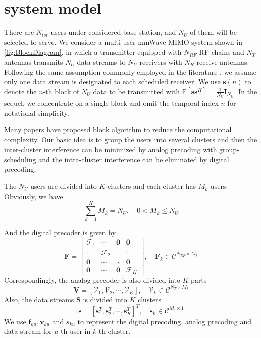 \documentclass[conference]{IEEEtran}
\begin{document}
\section{system model}
There are $N_{tot}$ users under considered base station, and $N_U$ of them will be selected to serve. We consider a multi-user mmWave MIMO system shown in \figurename{ \ref{fig:BlockDiagram}}, in which a transmitter equipped with $N_{RF}$ RF chains and $N_T$ antennas transmits $N_U$ data streams to $N_U$ receivers with $N_R$ receive antennas. Following the same assumption commonly employed in the literature \cite{alkhateeb2015limited}, we assume only one data stream is designated to each scheduled receiver. We use ${\bm s}(n)$ to denote the $n$-th block of $N_U$ data to be transmitted with $\mathbb{E}\left[\bm{ss}^H\right]=\frac{1}{N_U}\bm{I}_{N_U}$. In the sequel, we concentrate on a single block and omit the temporal index $n$ for notational simplicity.

Many papers have proposed block algorithm to reduce the computational complexity. Our basic idea is to group the users into several clusters and then the inter-cluster interference can be minimized by analog precoding with group-scheduling and the intra-cluster interference can be eliminated by digital precoding.

The $N_U$ users are divided into $K$ clusters and each cluster has $M_k$ users. Obviously, we have
\begin{equation}
	\sum_{k=1}^{K} M_k = N_U, \quad 0< M_k\leq N_U
\end{equation}

And the digital precoder is given by 
\begin{equation}
\bm{F} = 
\begin{bmatrix}
\bm{\mathcal{F}}_1&\cdots & \bm{0}&\bm{0}\\
\vdots & \bm{\mathcal{F}}_2 & \vdots&\vdots \\
\bm{0}&\cdots&\ddots &\bm{0}\\
\bm{0}&\cdots & \bm{0}&\bm{\mathcal{F}}_K
\end{bmatrix}
,\quad
\bm{F}_k \in \mathcal{C}^{N_{RF}\times M_k}
\end{equation}
Correspondingly, the analog precoder is also divided into $K$ parts
\begin{equation}
	\bm{V} = \left[\bm{\mathcal{V}}_1, \bm{\mathcal{V}}_2,\cdots, \bm{\mathcal{V}}_{K}\right], \quad \bm{\mathcal{V}}_k\in \mathcal{C}^{N_T\times M_k}
\end{equation}
Also, the data streams $\bm{S}$ is divided into $K$ clusters
\begin{equation}
\bm{s} = \left[{\mathbf{s}}_1^T, {\mathbf{s}}_2^T,\cdots, \mathbf{s}_{K}^T\right]^T, \quad \mathbf{s}_k\in \mathcal{C}^{M_j\times 1}
\end{equation}
We use $\bm{f}_{ku}, \bm{v}_{ku}$ and $s_{ku}$ to represent the digital precoding, analog precoding and data stream for $u$-th user in $k$-th cluster.
\end{document}
